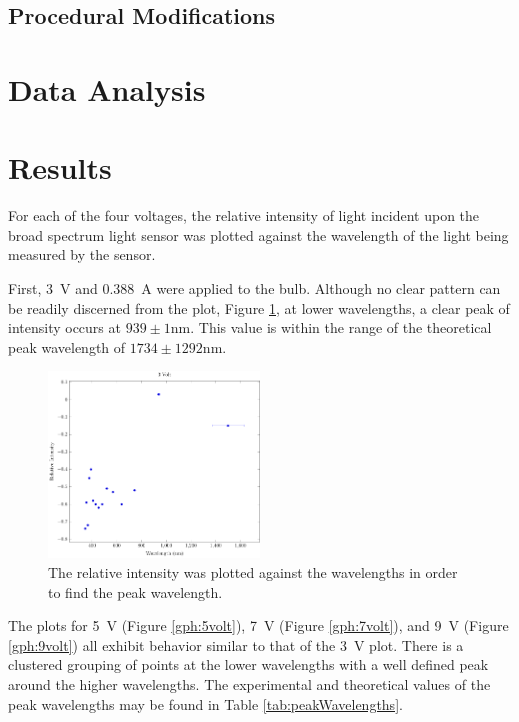 \documentclass[a4paper]{article}
\begin{document}
\subsection{Procedural Modifications}
\qq 

\section{Data Analysis}


\section{Results}

\qq For each of the four voltages, the relative intensity of light incident upon
the broad spectrum light sensor was plotted against the wavelength of the light
being measured by the sensor.

\qq First, \SI{3}{\volt} and \SI{0.388}{\ampere} were applied to the
bulb. Although no clear pattern can be readily discerned from the plot, Figure
\ref{gph:3volt}, at lower wavelengths, a clear peak of intensity occurs at
\( 939 \pm 1 \si{\nano\meter} \). This value is within the range of the
theoretical peak wavelength of \( 1734 \pm 1292 \si{\nano\meter} \). 

\begin{figure}[H]
  \begin{center}
    \includegraphics[width=0.5\textwidth]{P6-BlackbodyRadiation/Plots/3Volt/3volt.pdf}
  \end{center}
  \label{gph:3volt}
  \caption{The relative intensity was plotted against the wavelengths in order
    to find the peak wavelength.}
\end{figure}

\qq The plots for \SI{5}{\volt} (Figure \ref{gph:5volt}), \SI{7}{\volt} (Figure
\ref{gph:7volt}), and \SI{9}{\volt} (Figure \ref{gph:9volt}) all exhibit
behavior similar to that of the \SI{3}{\volt} plot. There is a clustered
grouping of points at the lower wavelengths with a well defined peak around the
higher wavelengths. The experimental and theoretical values of the peak
wavelengths may be found in Table \ref{tab:peakWavelengths}. 
\end{document}
